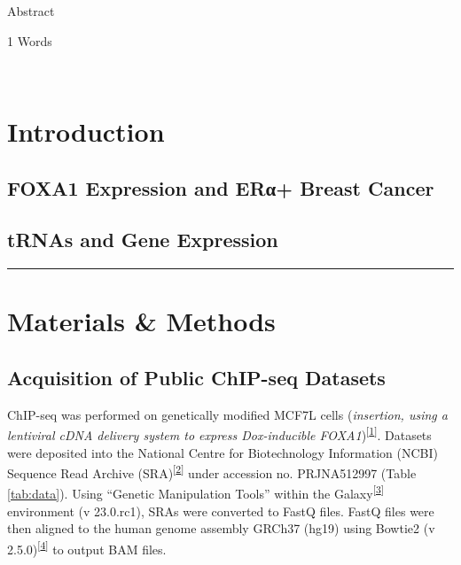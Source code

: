 \documentclass[
  12pt,
]{article}
\begin{document}
\hfill\break

Abstract

\normalsize
\begin{flushright}
1 Words
\end{flushright}
\hrulefill\\
\setlength{\parindent}{10pt}

\hypertarget{introduction}{%
\section{Introduction}\label{introduction}}

\hypertarget{foxa1-expression-and-erux3b1-breast-cancer}{%
\subsection{FOXA1 Expression and ERα+ Breast Cancer}\label{foxa1-expression-and-erux3b1-breast-cancer}}

\hypertarget{trnas-and-gene-expression}{%
\subsection{tRNAs and Gene Expression}\label{trnas-and-gene-expression}}

\begin{center}\rule{0.5\linewidth}{0.5pt}\end{center}

\hypertarget{materials-methods}{%
\section{Materials \& Methods}\label{materials-methods}}

\hypertarget{acquisition-of-public-chip-seq-datasets}{%
\subsection{Acquisition of Public ChIP-seq Datasets}\label{acquisition-of-public-chip-seq-datasets}}

ChIP-seq was performed on genetically modified MCF7L cells (\emph{insertion, using a lentiviral cDNA delivery system to express Dox-inducible FOXA1})\textsuperscript{{[}\protect\hyperlink{ref-fu2019}{1}{]}}.
Datasets were deposited into the National Centre for Biotechnology Information (NCBI) Sequence Read Archive (SRA)\textsuperscript{{[}\protect\hyperlink{ref-leinonen2010}{2}{]}} under accession no.
PRJNA512997 (Table \ref{tab:data}).
Using ``Genetic Manipulation Tools'' within the Galaxy\textsuperscript{{[}\protect\hyperlink{ref-thegala2022}{3}{]}} environment (v 23.0.rc1), SRAs were converted to FastQ files.
FastQ files were then aligned to the human genome assembly GRCh37 (hg19) using Bowtie2 (v 2.5.0)\textsuperscript{{[}\protect\hyperlink{ref-langmead2012}{4}{]}} to output BAM files.
\end{document}

